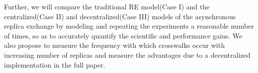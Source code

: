 \documentclass[a4paper,10pt]{article}
\newcommand{\jhanote}[1]{ {\textcolor{red} { ***shantenu: #1 }}}
\newcommand{\athotanote}[1]{ {\textcolor{green} { ***athota: #1 }}}
\newcommand{\jhanote}[1]{}
\newcommand{\athotanote}[1]{}
\begin{document}
Further, we will compare the traditional RE model(Case I) and the centralized(Case II) and decentralized(Case III) models of the asynchronous replica exchange by modeling and repeating the experiments a reasonable number of times, so as to accurately quantify the scientific and performance gains. We also propose to measure the frequency with which crosswalks occur with increasing number of replicas and measure the advantages due to a decentralized implementation in the full paper.


 
  
 
\end{document}
